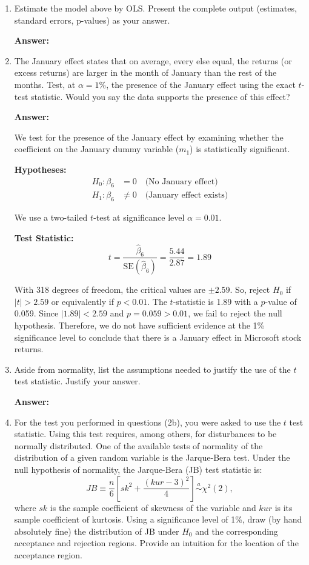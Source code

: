 \documentclass[12pt,a4paper]{article}
\begin{document}
\begin{enumerate}[label=(\alph*)]
  \item Estimate the model above by OLS. Present the complete output (estimates, standard errors, p-values) as your answer.
  
  \textbf{Answer:} 

  
  
  \item The January effect states that on average, every else equal, the returns (or excess returns) are larger in the month of January than the rest of the months. Test, at $\alpha = 1\%$, the presence of the January effect using the exact $t$-test statistic. Would you say the data supports the presence of this effect?
  
  \textbf{Answer:} 

  We test for the presence of the January effect by examining whether the coefficient on the January dummy variable ($m_1$) is statistically significant.

  \textbf{Hypotheses:}
  \begin{align*}
      H_0: \beta_6 &= 0 \quad \text{(No January effect)} \\
      H_1: \beta_6 &\neq 0 \quad \text{(January effect exists)}
  \end{align*}

  We use a two-tailed $t$-test at significance level $\alpha = 0.01$.

    \textbf{Test Statistic:}
      \[
          t = \frac{\hat{\beta}_6}{\text{SE}(\hat{\beta}_6)} = \frac{5.44}{2.87} = 1.89
      \]

  With 318 degrees of freedom, the critical values are $\pm 2.59$. So, reject $H_0$ if $|t| > 2.59$ or equivalently if $p < 0.01$.
  The $t$-statistic is 1.89 with a $p$-value of 0.059. Since $|1.89| < 2.59$ and $p = 0.059 > 0.01$, we fail to reject the null hypothesis.
  Therefore, we do not have sufficient evidence at the 1\% significance level to conclude that there is a January effect in Microsoft stock returns.
  
  \item Aside from normality, list the assumptions needed to justify the use of the $t$ test statistic. Justify your answer.
  
  \textbf{Answer:} 
  
  \item For the test you performed in questions (2b), you were asked to use the $t$ test statistic. Using this test requires, among others, for disturbances to be normally distributed. One of the available tests of normality of the distribution of a given random variable is the Jarque-Bera test. Under the null hypothesis of normality, the Jarque-Bera (JB) test statistic is:
  \[
  JB \equiv \frac{n}{6}\left[sk^2 + \frac{(kur - 3)^2}{4}\right] \stackrel{a}{\sim} \chi^2(2),
  \]
  where $sk$ is the sample coefficient of skewness of the variable and $kur$ is its sample coefficient of kurtosis. Using a significance level of 1\%, draw (by hand absolutely fine) the distribution of JB under $H_0$ and the corresponding acceptance and rejection regions. Provide an intuition for the location of the acceptance region.
  

\end{enumerate}
\end{document}

